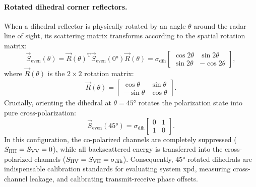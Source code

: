 \paragraph{Rotated dihedral corner reflectors.}
When a dihedral reflector is physically rotated by an angle $\theta$ around the radar line of sight, its scattering matrix transforms according to the spatial rotation matrix:
\begin{equation}
    \label{eq:canonical-even-bounce-rotated}
    \vec S_{\text{even}}(\theta) = \vec R(\theta)^{\mathrm{T}} \vec S_{\text{even}}(\ang{0}) \vec R(\theta) = \sigma_{\text{dih}} \begin{bmatrix} \cos 2\theta & \sin 2\theta \\ \sin 2\theta & -\cos 2\theta \end{bmatrix},
\end{equation}
where $\vec R(\theta)$ is the $2 \times 2$ rotation matrix:
\begin{align}
    \vec R(\theta) = \begin{bmatrix} \cos\theta & \sin\theta \\ -\sin\theta & \cos\theta \end{bmatrix}.
\end{align}
Crucially, orienting the dihedral at $\theta = \ang{45}$ rotates the polarization state into pure cross-polarization:
\begin{equation}
    \label{eq:canonical-even-bounce-45}
    \vec S_{\text{even}}(\ang{45}) = \sigma_{\text{dih}} \begin{bmatrix} 0 & 1 \\ 1 & 0 \end{bmatrix}.
\end{equation}
In this configuration, the co-polarized channels are completely suppressed ($S_{\mathrm{HH}} = S_{\mathrm{VV}} = 0$), while all backscattered energy is transferred into the cross-polarized channels ($S_{\mathrm{HV}} = S_{\mathrm{VH}} = \sigma_{\text{dih}}$).
Consequently, $\ang{45}$-rotated dihedrals are indispensable calibration standards for evaluating system \gls{xpd}, measuring cross-channel leakage, and calibrating transmit-receive phase offsets.

